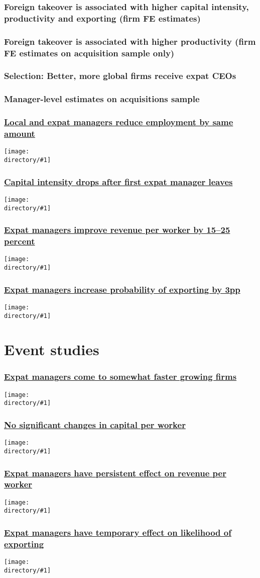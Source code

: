 \documentclass[aspectratio=169,compress,mathserif]{beamer}
\newcommand{\regressiontable}[1]{}
\newcounter{ora}
\newcounter{perc}
\newcommand{\directory}{output/figure}
\newcommand{\longfigure}[2]{\begin{frame}\frametitle{\hyperlink{#1back}{#2}}\hypertarget{#1}{{\begin{center}\texttt{[image: \\directory/\#1]}\end{center}}}\end{frame}}
\begin{document}
\begin{frame}\frametitle{Foreign takeover is associated with higher capital intensity, productivity and exporting (firm FE estimates)}\hypertarget{Foreign takeover is associated with higher capital intensity, productivity and exporting (firm FE estimates)}{}
\regressiontable{baseline_FE}


\end{frame}



\begin{frame}\frametitle{Foreign takeover is associated with higher productivity (firm FE estimates on acquisition sample only)}\hypertarget{Foreign takeover is associated with higher productivity (firm FE estimates on acquisition sample only)}{}
\regressiontable{acquisitions_FE}


\end{frame}



\begin{frame}\frametitle{Selection: Better, more global firms receive expat CEOs}\hypertarget{Selection: Better, more global firms receive expat CEOs}{}
\regressiontable{selection}




\end{frame}



\begin{frame}\frametitle{Manager-level estimates on acquisitions sample}\hypertarget{Manager-level estimates on acquisitions sample}{}
\regressiontable{acquisitions}
\end{frame}






\longfigure{acquisitions_lnL_slope}{Local and expat managers reduce employment by same amount}
\longfigure{acquisitions_lnKL_slope}{Capital intensity drops after first expat manager leaves}
\longfigure{acquisitions_lnQL_slope}{Expat managers improve revenue per worker by 15--25 percent}
\longfigure{acquisitions_exporter_slope}{Expat managers increase probability of exporting by 3pp}






\section{Event studies}\hypertarget{Event studies}{}
\longfigure{lnL_event_study}{Expat managers come to somewhat faster growing firms}
\longfigure{lnKL_event_study}{No significant changes in capital per worker}
\longfigure{lnQL_event_study}{Expat managers have persistent effect on revenue per worker}
\longfigure{exporter_event_study}{Expat managers have temporary effect on likelihood of exporting}
\end{document}
